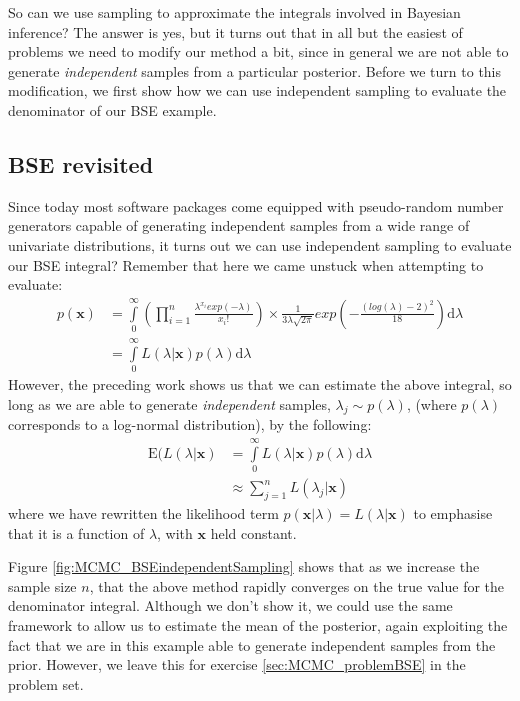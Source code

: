 \documentclass[11pt,fullpage]{book}
\begin{document}
So can we use sampling to approximate the integrals involved in Bayesian inference? The answer is yes, but it turns out that in all but the easiest of problems we need to modify our method a bit, since in general we are not able to generate \textit{independent} samples from a particular posterior. Before we turn to this modification, we first show how we can use independent sampling to evaluate the denominator of our BSE example.

\subsection{BSE revisited}
Since today most software packages come equipped with pseudo-random number generators capable of generating independent samples from a wide range of univariate distributions, it turns out we can use independent sampling to evaluate our BSE integral? Remember that here we came unstuck when attempting to evaluate:
%
\begin{align}\label{eq:MCMC_denominatorBSE2}
p(\boldsymbol{x}) &= \int\limits_{0}^{\infty}\left(\prod\limits_{i=1}^{n} \frac{\lambda^{x_i} exp(-\lambda)}{x_i!}\right) \times \frac{1}{3\lambda\sqrt{2\pi}} exp\left(-\frac{(log(\lambda)-2)^2}{18}\right)\mathrm{d}\lambda\\
&= \int\limits_{0}^{\infty} L(\lambda|\boldsymbol{x}) p(\lambda)\mathrm{d}\lambda
\end{align}
%
However, the preceding work shows us that we can estimate the above integral, so long as we are able to generate \textit{independent} samples, $\lambda_j\sim p(\lambda)$, (where $p(\lambda)$ corresponds to a log-normal distribution), by the following:
%
\begin{align}
\mathrm{E}(L(\lambda|\boldsymbol{x}) &= \int\limits_{0}^{\infty} L(\lambda|\boldsymbol{x}) p(\lambda)\mathrm{d}\lambda\\
&\approx \sum\limits_{j=1}^{n} L(\lambda_j|\boldsymbol{x})
\end{align}
%
where we have rewritten the likelihood term $p(\boldsymbol{x}|\lambda)=L(\lambda|\boldsymbol{x})$ to emphasise that it is a function of $\lambda$, with $\boldsymbol{x}$ held constant.

Figure \ref{fig:MCMC_BSEindependentSampling} shows that as we increase the sample size $n$, that the above method rapidly converges on the true value for the denominator integral. Although we don't show it, we could use the same framework to allow us to estimate the mean of the posterior, again exploiting the fact that we are in this example able to generate independent samples from the prior. However, we leave this for exercise \ref{sec:MCMC_problemBSE} in the problem set.
\end{document}
